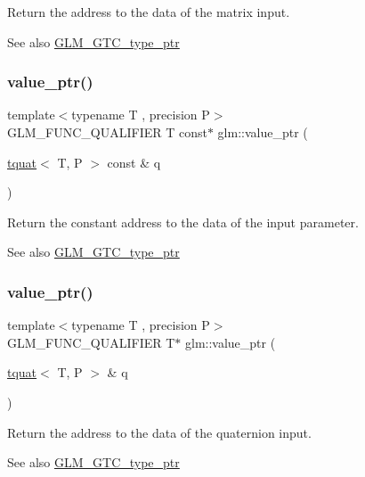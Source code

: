 Return the address to the data of the matrix input. \begin{DoxySeeAlso}{See also}
\hyperlink{group__gtc__type__ptr}{G\+L\+M\+\_\+\+G\+T\+C\+\_\+type\+\_\+ptr} 
\end{DoxySeeAlso}
\mbox{\label{group__gtc__type__ptr_ga26a38ff14840b35c57fa937711c5168c}} 
\subsubsection{\texorpdfstring{value\+\_\+ptr()}{value\_ptr()}\hspace{0.1cm}{\footnotesize\ttfamily [26/27]}}
{\footnotesize\ttfamily template$<$typename T , precision P$>$ \\
G\+L\+M\+\_\+\+F\+U\+N\+C\+\_\+\+Q\+U\+A\+L\+I\+F\+I\+ER T const$\ast$ glm\+::value\+\_\+ptr (\begin{DoxyParamCaption}\item[{\hyperlink{structglm_1_1tquat}{tquat}$<$ T, P $>$ const \&}]{q }\end{DoxyParamCaption})}

Return the constant address to the data of the input parameter. \begin{DoxySeeAlso}{See also}
\hyperlink{group__gtc__type__ptr}{G\+L\+M\+\_\+\+G\+T\+C\+\_\+type\+\_\+ptr} 
\end{DoxySeeAlso}
\mbox{\label{group__gtc__type__ptr_ga637414d7a9e8877e66a59f3b3d700898}} 
\subsubsection{\texorpdfstring{value\+\_\+ptr()}{value\_ptr()}\hspace{0.1cm}{\footnotesize\ttfamily [27/27]}}
{\footnotesize\ttfamily template$<$typename T , precision P$>$ \\
G\+L\+M\+\_\+\+F\+U\+N\+C\+\_\+\+Q\+U\+A\+L\+I\+F\+I\+ER T$\ast$ glm\+::value\+\_\+ptr (\begin{DoxyParamCaption}\item[{\hyperlink{structglm_1_1tquat}{tquat}$<$ T, P $>$ \&}]{q }\end{DoxyParamCaption})}

Return the address to the data of the quaternion input. \begin{DoxySeeAlso}{See also}
\hyperlink{group__gtc__type__ptr}{G\+L\+M\+\_\+\+G\+T\+C\+\_\+type\+\_\+ptr} 
\end{DoxySeeAlso}
